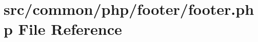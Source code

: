 \hypertarget{footer_8php}{}\section{src/common/php/footer/footer.php File Reference}
\label{footer_8php}
